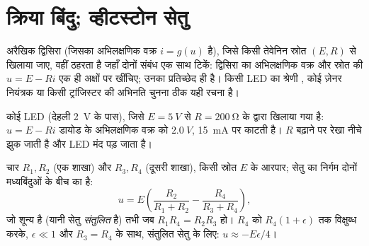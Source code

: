 \section{क्रिया बिंदु; व्हीटस्टोन सेतु}

\begin{method}[आलेखीय क्रिया बिंदु]\label{met:b1:dc-circuits:loadline}
अरैखिक द्विसिरा (जिसका अभिलक्षणिक वक्र $i = g(u)$ है), जिसे किसी तेवेनिन
स्रोत $(E, R)$ से खिलाया जाए, वहीं ठहरता है जहाँ दोनों संबंध एक साथ टिकें: द्विसिरा का
अभिलक्षणिक वक्र और स्रोत की \emph{} $u = E - Ri$ एक ही अक्षों पर
खींचिए; उनका प्रतिच्छेद ही \emph{} है। किसी LED का श्रेणी
, कोई ज़ेनर नियंत्रक या किसी ट्रांजिस्टर की अभिनति चुनना ठीक यही रचना
है।
\end{method}

\begin{omfigure}

{\small कोई LED (देहली \qty{2}{V} के पास), जिसे $E = \qty{5}{V}$
से $R = \qty{200}{\ohm}$ के द्वारा खिलाया गया है:  $u = E - Ri$
डायोड के अभिलक्षणिक वक्र को $\qty{2.0}{V}$, \qty{15}{mA} पर काटती है। $R$
बढ़ाने पर रेखा नीचे झुक जाती है और LED मंद पड़ जाता है।}
\end{omfigure}

\begin{proposition}[व्हीटस्टोन सेतु]\label{prop:b1:dc-circuits:wheatstone}
चार  $R_1, R_2$ (एक शाखा) और $R_3, R_4$ (दूसरी शाखा), किसी स्रोत
$E$ के आरपार; सेतु का निर्गम दोनों मध्यबिंदुओं के बीच का  है:
\[
u = E\left(\frac{R_2}{R_1 + R_2} - \frac{R_4}{R_3 + R_4}\right),
\]
जो शून्य है (यानी सेतु \emph{संतुलित} है) तभी जब $R_1R_4 = R_2R_3$ हो।
$R_4$ को $R_4(1 + \epsilon)$ तक विक्षुब्ध करके, $\epsilon
\ll 1$ और $R_3 = R_4$ के साथ, संतुलित सेतु के लिए: $u \approx -E\epsilon/4$।
\end{proposition}

